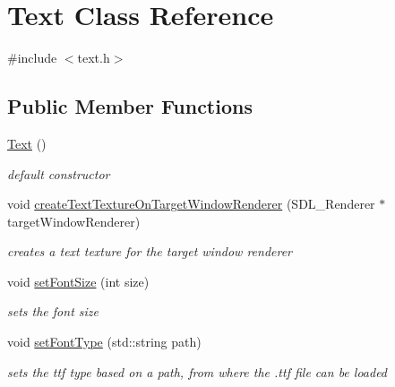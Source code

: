 \hypertarget{class_text}{}\section{Text Class Reference}
\label{class_text}


{\ttfamily \#include $<$text.\+h$>$}

\subsection*{Public Member Functions}
\begin{DoxyCompactItemize}
\item 
\hypertarget{class_text_ab3e26143fccc52699bcc5149cae852bc}{}\label{class_text_ab3e26143fccc52699bcc5149cae852bc} 
\hyperlink{class_text_ab3e26143fccc52699bcc5149cae852bc}{Text} ()
\begin{DoxyCompactList}\small\item\em default constructor \end{DoxyCompactList}\item 
\hypertarget{class_text_a8ef75f69a6e3ea48a56a435e68368815}{}\label{class_text_a8ef75f69a6e3ea48a56a435e68368815} 
void \hyperlink{class_text_a8ef75f69a6e3ea48a56a435e68368815}{create\+Text\+Texture\+On\+Target\+Window\+Renderer} (S\+D\+L\+\_\+\+Renderer $\ast$target\+Window\+Renderer)
\begin{DoxyCompactList}\small\item\em creates a text texture for the target window renderer \end{DoxyCompactList}\item 
\hypertarget{class_text_ae9a6644bd6fff46b4e4fbf909036cc4b}{}\label{class_text_ae9a6644bd6fff46b4e4fbf909036cc4b} 
void \hyperlink{class_text_ae9a6644bd6fff46b4e4fbf909036cc4b}{set\+Font\+Size} (int size)
\begin{DoxyCompactList}\small\item\em sets the font size \end{DoxyCompactList}\item 
\hypertarget{class_text_a1740486bdd9be6e5377e6bb2f579e547}{}\label{class_text_a1740486bdd9be6e5377e6bb2f579e547} 
void \hyperlink{class_text_a1740486bdd9be6e5377e6bb2f579e547}{set\+Font\+Type} (std\+::string path)
\begin{DoxyCompactList}\small\item\em sets the ttf type based on a path, from where the .ttf file can be loaded \end{DoxyCompactList}\item 

\end{DoxyCompactItemize}
